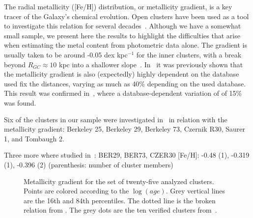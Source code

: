 \documentclass[draft]{aa}
\begin{document}
  The radial metallicity ([Fe/H]) distribution, or metallicity gradient, is a
  key tracer of the Galaxy's chemical evolution. Open clusters have been used as
  a tool to investigate this relation for several decades~\citep{Janes_1979}.
  Although we have a somewhat small sample, we present here the results to
  highlight the difficulties that arise when estimating the metal content from
  photometric data alone.
  The gradient is usually taken to be around -0.05 dex kpc$^{-1}$ for the inner
  clusters, with a break beyond $R_{GC}\approx10$ kpc into a shallower
  slope~\citep{Donor_2020}. In~\cite{Donor_2018} it was previously shown that
  the metallicity gradient is also (expectedly) highly dependent on the database
  used fix the distances, varying as much as 40\% depending on the used
  database. This result was confirmed in~\citep{Donor_2020}, where a
  database-dependent variation of of 15\% was found.




  Six of the clusters in our sample were investigated in~\cite{Netopil_2021} in
  relation with the metallicity gradient: Berkeley 25, Berkeley 29, Berkeley 73,
  Czernik R30, Saurer 1, and Tombaugh 2.

  Three more where studied in~\cite{Spina_2021}: BER29, BER73, CZER30
  [Fe/H]: -0.48 (1), -0.319 (1), -0.396 (2)
  (parenthesis: number of cluster members)


  \begin{figure}
   \caption{Metallicity gradient for the set of twenty-five analyzed clusters.
   Points are colored according to the $\log(age)$. Grey vertical lines are the
   16th and 84th percentiles. The dotted line is the broken relation from 
   \citet[][Fig 7]{Donor_2020}. The grey dots are the ten verified clusters
   from~\cite{Perren_2020}.}
   \label{fig:met_gradient}
  \end{figure}
\end{document}
